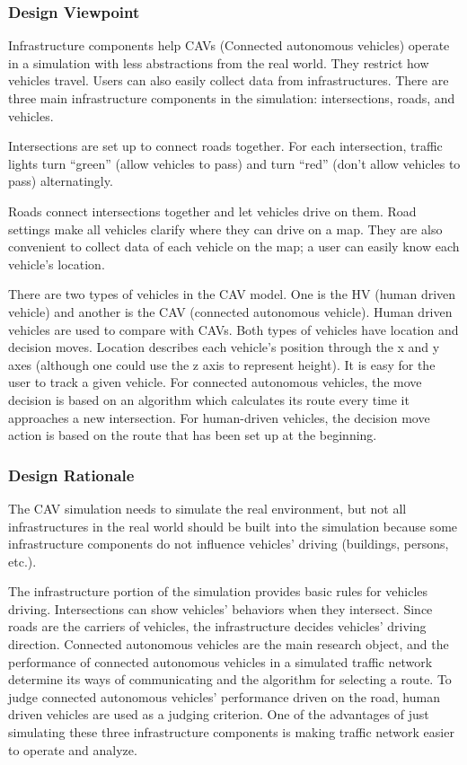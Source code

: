 \documentclass[onecolumn, draftclsnofoot,10pt, compsoc]{IEEEtran}
\begin{document}
\subsubsection{Design Viewpoint}
Infrastructure components help CAVs (Connected autonomous vehicles) operate in a simulation with less abstractions from the real world.
They restrict how vehicles travel.
Users can also easily collect data from infrastructures.
There are three main infrastructure components in the simulation: intersections, roads, and vehicles.

Intersections are set up to connect roads together.
For each intersection, traffic lights turn “green” (allow vehicles to pass) and turn “red” (don’t allow vehicles to pass) alternatingly.

Roads connect intersections together and let vehicles drive on them.
Road settings make all vehicles clarify where they can drive on a map.
They are also convenient to collect data of each vehicle on the map; a user can easily know each vehicle’s location.

There are two types of vehicles in the CAV model.
One is the HV (human driven vehicle) and another is the CAV (connected autonomous vehicle).
Human driven vehicles are used to compare with CAVs.
Both types of vehicles have location and decision moves.
Location describes each vehicle’s position through the x and y axes (although one could use the z axis to represent height).
It is easy for the user to track a given vehicle.
For connected autonomous vehicles, the move decision is based on an algorithm which calculates its route every time it approaches a new intersection.
For human-driven vehicles, the decision move action is based on the route that has been set up at the beginning.
\subsubsection{Design Rationale}
The CAV simulation needs to simulate the real environment, but not all infrastructures in the real world should be built into the simulation because some infrastructure components do not influence vehicles’ driving (buildings, persons, etc.).

The infrastructure portion of the simulation provides basic rules for vehicles driving.
Intersections can show vehicles’ behaviors when they intersect.
Since roads are the carriers of vehicles, the infrastructure decides vehicles’ driving direction.
Connected autonomous vehicles are the main research object, and the performance of connected autonomous vehicles in a simulated traffic network determine its ways of communicating and the algorithm for selecting a route.
To judge connected autonomous vehicles’ performance driven on the road, human driven vehicles are used as a judging criterion.
One of the advantages of just simulating these three infrastructure components is making traffic network easier to operate and analyze.
\end{document}
